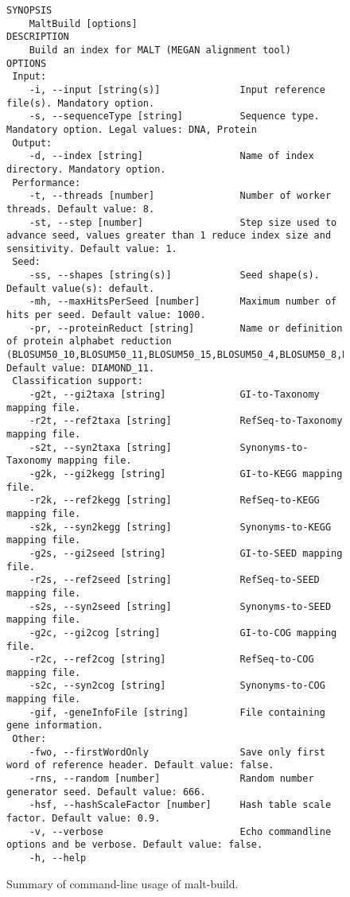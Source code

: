 \documentclass[11pt]{article}
\begin{document}
\begin{figure}[h]
{\tiny
\begin{verbatim}
SYNOPSIS
	MaltBuild [options]
DESCRIPTION
	Build an index for MALT (MEGAN alignment tool)
OPTIONS
 Input:
	-i, --input [string(s)]              Input reference file(s). Mandatory option.
	-s, --sequenceType [string]          Sequence type. Mandatory option. Legal values: DNA, Protein
 Output:
	-d, --index [string]                 Name of index directory. Mandatory option.
 Performance:
	-t, --threads [number]               Number of worker threads. Default value: 8.
	-st, --step [number]                 Step size used to advance seed, values greater than 1 reduce index size and sensitivity. Default value: 1.
 Seed:
	-ss, --shapes [string(s)]            Seed shape(s). Default value(s): default.
	-mh, --maxHitsPerSeed [number]       Maximum number of hits per seed. Default value: 1000.
	-pr, --proteinReduct [string]        Name or definition of protein alphabet reduction (BLOSUM50_10,BLOSUM50_11,BLOSUM50_15,BLOSUM50_4,BLOSUM50_8,DIAMOND_11,GBMR4,HSDM17,MALT_10,SDM12,UNREDUCED). Default value: DIAMOND_11.
 Classification support:
	-g2t, --gi2taxa [string]             GI-to-Taxonomy mapping file. 
	-r2t, --ref2taxa [string]            RefSeq-to-Taxonomy mapping file. 
	-s2t, --syn2taxa [string]            Synonyms-to-Taxonomy mapping file. 
	-g2k, --gi2kegg [string]             GI-to-KEGG mapping file. 
	-r2k, --ref2kegg [string]            RefSeq-to-KEGG mapping file. 
	-s2k, --syn2kegg [string]            Synonyms-to-KEGG mapping file. 
	-g2s, --gi2seed [string]             GI-to-SEED mapping file. 
	-r2s, --ref2seed [string]            RefSeq-to-SEED mapping file. 
	-s2s, --syn2seed [string]            Synonyms-to-SEED mapping file. 
	-g2c, --gi2cog [string]              GI-to-COG mapping file. 
	-r2c, --ref2cog [string]             RefSeq-to-COG mapping file. 
	-s2c, --syn2cog [string]             Synonyms-to-COG mapping file. 
	-gif, -geneInfoFile [string]         File containing gene information. 
 Other:
	-fwo, --firstWordOnly                Save only first word of reference header. Default value: false.
	-rns, --random [number]              Random number generator seed. Default value: 666.
	-hsf, --hashScaleFactor [number]     Hash table scale factor. Default value: 0.9.
	-v, --verbose                        Echo commandline options and be verbose. Default value: false.
	-h, --help  
\end{verbatim}
}
\caption{Summary of command-line usage of malt-build.}\label{fig:malt-build-usage}
\end{figure}
\end{document}
